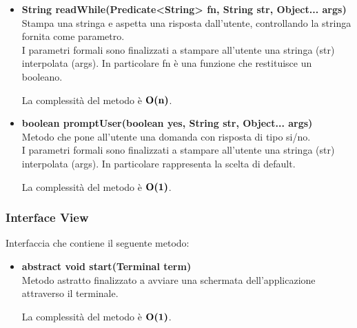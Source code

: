 \documentclass[a4paper, 12pt]{scrreprt}
\begin{document}
\begin{itemize}
					La complessit\`a del metodo \`e $\bigO\textbf{(1)}$.

					\item \textbf{String readWhile(Predicate<String> fn, String str, Object... args)}
					\\Stampa una stringa e aspetta una risposta dall'utente, controllando la stringa fornita come parametro.
					\\I parametri formali sono finalizzati a stampare all'utente una stringa (str) interpolata (args). In particolare fn \`e una funzione che restituisce un booleano.

					La complessit\`a del metodo \`e $\mathbf{O}\textbf{(n)}$.

					\item \textbf{boolean promptUser(boolean yes, String str, Object... args)}
					\\Metodo che pone all'utente una domanda con risposta di tipo si/no.
					\\I parametri formali sono finalizzati a stampare all'utente una stringa (str) interpolata (args). In particolare rappresenta la scelta di default.

					La complessit\`a del metodo \`e $\bigO\textbf{(1)}$.

				\end{itemize}

				\subsubsection{Interface View}
				Interfaccia che contiene il seguente metodo:
				\begin{itemize}
					\item \textbf{abstract void start(Terminal term)}
					\\Metodo astratto finalizzato a avviare una schermata dell'applicazione attraverso il terminale.

					La complessit\`a del metodo \`e $\bigO\textbf{(1)}$.
				\end{itemize}
\end{document}
